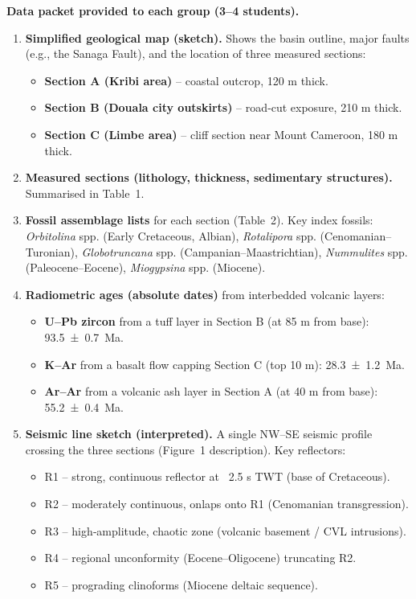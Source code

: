 \documentclass[11pt]{article}
\newcommand{\cle}[1]{{\popxbold\color{popdark}#1}}
\begin{document}
\begin{experience}
\textbf{Data packet provided to each group (3–4 students).}
\begin{enumerate}
    \item \textbf{Simplified geological map (sketch).} Shows the basin outline, major faults (e.g., the \cle{Sanaga Fault}), and the location of three measured sections:
        \begin{itemize}
            \item \textbf{Section A (Kribi area)} – coastal outcrop, 120 m thick.
            \item \textbf{Section B (Douala city outskirts)} – road‑cut exposure, 210 m thick.
            \item \textbf{Section C (Limbe area)} – cliff section near Mount Cameroon, 180 m thick.
        \end{itemize}
    \item \textbf{Measured sections (lithology, thickness, sedimentary structures).} Summarised in Table~1.
    \item \textbf{Fossil assemblage lists} for each section (Table~2). Key index fossils: \emph{Orbitolina} spp. (Early Cretaceous, Albian), \emph{Rotalipora} spp. (Cenomanian–Turonian), \emph{Globotruncana} spp. (Campanian–Maastrichtian), \emph{Nummulites} spp. (Paleocene–Eocene), \emph{Miogypsina} spp. (Miocene).
    \item \textbf{Radiometric ages (absolute dates)} from interbedded volcanic layers:
        \begin{itemize}
            \item \textbf{U–Pb zircon} from a tuff layer in Section B (at 85 m from base): \SI{93.5 \pm 0.7}{Ma}.
            \item \textbf{K–Ar} from a basalt flow capping Section C (top 10 m): \SI{28.3 \pm 1.2}{Ma}.
            \item \textbf{Ar–Ar} from a volcanic ash layer in Section A (at 40 m from base): \SI{55.2 \pm 0.4}{Ma}.
        \end{itemize}
    \item \textbf{Seismic line sketch (interpreted).} A single NW–SE seismic profile crossing the three sections (Figure~1 description). Key reflectors: 
        \begin{itemize}
            \item R1 – strong, continuous reflector at ~2.5 s TWT (base of Cretaceous).
            \item R2 – moderately continuous, onlaps onto R1 (Cenomanian transgression).
            \item R3 – high‑amplitude, chaotic zone (volcanic basement / CVL intrusions).
            \item R4 – regional unconformity (Eocene–Oligocene) truncating R2.
            \item R5 – prograding clinoforms (Miocene deltaic sequence).
        \end{itemize}
\end{enumerate}


\end{experience}
\end{document}
